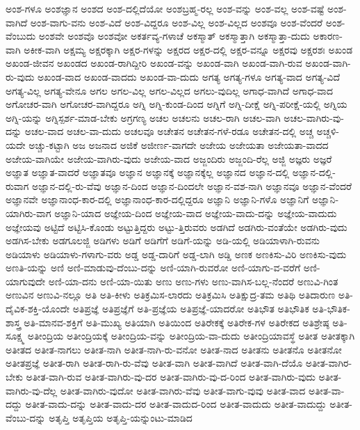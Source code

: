 {ಅಂಶ-ಗಳೂ
ಅಂಶಜ್ಞಾನ
ಅಂಶದ
ಅಂಶ-ದಲ್ಲಿದೆಯೋ
ಅಂಶಬ್ರಹ್ಮ-ರಲ್ಲ
ಅಂಶ-ವನ್ನು
ಅಂಶ-ವಲ್ಲ
ಅಂಶ-ವಷ್ಟೆ
ಅಂಶ-ವಾಗಿದೆ
ಅಂಶ-ವಾಗು-ವನು
ಅಂಶ-ವಿದೆ
ಅಂಶ-ವಿದ್ದರೂ
ಅಂಶ-ವಿಲ್ಲ
ಅಂಶ-ವಿಲ್ಲದ
ಅಂಶವೂ
ಅಂಶ-ವೆಂದರೆ
ಅಂಶ-ವೆಂಬುದು
ಅಂಶವೇ
ಅಂಶವೊ
ಅಂಶವೋ
ಅಕರ್ತವ್ಯ-ಗಳಾಚೆ
ಅಕಸ್ಮಾತ್
ಅಕಸ್ಮಾತ್ತಾಗಿ
ಅಕಸ್ಮಾತ್ತಾ-ದುದು
ಅಕಾರಣ-ವಾಗಿ
ಅಕೀಕ-ವಾಗಿ
ಅಕ್ಷಮ್ಯ
ಅಕ್ಷರಕ್ಕಾಗಿ
ಅಕ್ಷರ-ಗಳನ್ನು
ಅಕ್ಷರದ
ಅಕ್ಷರ-ದಲ್ಲಿ
ಅಕ್ಷರ-ವನ್ನೂ
ಅಕ್ಷರವು
ಅಕ್ಷರಶಃ
ಅಖಂಡ
ಅಖಂಡ-ಜೀವನ
ಅಖಂಡದ
ಅಖಂಡ-ರಾಗಿದ್ದೀರಿ
ಅಖಂಡ-ವನ್ನು
ಅಖಂಡ-ವಾಗಿ
ಅಖಂಡ-ವಾಗಿ-ರುವ
ಅಖಂಡ-ವಾಗಿ-ರು-ವುದು
ಅಖಂಡ-ವಾದ
ಅಖಂಡ-ವಾದದು
ಅಖಂಡ-ವಾ-ದುದು
ಅಗತ್ಯ
ಅಗತ್ಯ-ಗಳೂ
ಅಗತ್ಯ-ವಾದ
ಅಗತ್ಯ-ವಿದೆ
ಅಗತ್ಯ-ವಿಲ್ಲ
ಅಗತ್ಯ-ವೇನೂ
ಅಗಲ
ಅಗಲ-ವಿಲ್ಲ
ಅಗಲ-ವಿಲ್ಲದ
ಅಗಲು-ವುದಿಲ್ಲ
ಅಗಾಧ-ವಾಗಿದೆ
ಅಗಾಧ-ವಾದ
ಅಗೋಚರ-ವಾಗಿ
ಅಗೋಚರ-ವಾಗಿದ್ದರೂ
ಅಗ್ನಿ
ಅಗ್ನಿ-ಕುಂಡ-ದಿಂದ
ಅಗ್ನಿಗೆ
ಅಗ್ನಿ-ದೀಕ್ಷೆ
ಅಗ್ನಿ-ಪರೀಕ್ಷೆ-ಯಲ್ಲಿ
ಅಗ್ನಿಯ
ಅಗ್ನಿ-ಯನ್ನು
ಅಗ್ನಿಸ್ಪರ್ಶ-ಮಾಡ-ಬೇಕು
ಅಗ್ರಗಣ್ಯ
ಅಚಲ
ಅಚಲನು
ಅಚಲ-ರಾಗಿ
ಅಚಲ-ವಾಗಿ
ಅಚಲ-ವಾಗಿರು-ವು-ದನ್ನು
ಅಚಲ-ವಾದ
ಅಚಲ-ವಾ-ದುದು
ಅಚಲವೂ
ಅಚೇತನ
ಅಚೇತನ-ಗಳೆ-ರಡೂ
ಅಚೇತನ-ದಲ್ಲಿ
ಅಚ್ಚ
ಅಚ್ಚಳಿ-ಯದೇ
ಅಚ್ಚು-ಕಟ್ಟಾಗಿ
ಅಜ
ಅಜನಾದ
ಅಜಿಕೆ
ಅಜೀರ್ಣ-ವಾಗದೇ
ಅಜೇಯ
ಅಜೇಯತಾ
ಅಜೇಯತಾ-ವಾದದ
ಅಜೇಯ-ವಾಗಿಯೇ
ಅಜೇಯ-ವಾಗಿರು-ವುದು
ಅಜೇಯ-ವಾದ
ಅಜ್ಜಂದಿರು
ಅಜ್ಜಂದಿ-ರೆಲ್ಲ
ಅಜ್ಜಿ
ಅಜ್ಞರು
ಅಜ್ಞರೆ
ಅಜ್ಞಾತ
ಅಜ್ಞಾತ-ವಾದರೆ
ಅಜ್ಞಾತವೂ
ಅಜ್ಞಾನ
ಅಜ್ಞಾನಕ್ಕೆ
ಅಜ್ಞಾನಕ್ಕೆಲ್ಲ
ಅಜ್ಞಾನದ
ಅಜ್ಞಾನ-ದಲ್ಲಿ
ಅಜ್ಞಾನ-ದಲ್ಲಿ-ರುವಾಗ
ಅಜ್ಞಾನ-ದಲ್ಲಿ-ರು-ವೆವು
ಅಜ್ಞಾನ-ದಿಂದ
ಅಜ್ಞಾನ-ದಿಂದಲೇ
ಅಜ್ಞಾನ-ವಶ-ನಾಗಿ
ಅಜ್ಞಾನವೂ
ಅಜ್ಞಾನ-ವೆಂದರೆ
ಅಜ್ಞಾನವೇ
ಅಜ್ಞಾನಾಂಧ-ಕಾರ-ದಲ್ಲಿ
ಅಜ್ಞಾನಾಂಧ-ಕಾರ-ದಲ್ಲಿದ್ದರೂ
ಅಜ್ಞಾನಿ
ಅಜ್ಞಾನಿ-ಗಳೊ
ಅಜ್ಞಾನಿಗೆ
ಅಜ್ಞಾನಿ-ಯಾಗಿರು-ವಾಗ
ಅಜ್ಞಾನಿ-ಯಾದ
ಅಜ್ಞೇಯ-ದಿಂದ
ಅಜ್ಞೇಯ-ವಾದ
ಅಜ್ಞೇಯ-ವಾದು-ದನ್ನು
ಅಜ್ಞೇಯ-ವಾದುದು
ಅಜ್ಞೇಯವು
ಅಟ್ಟಿದೆ
ಅಟ್ಟಿಸಿ-ಕೊಂಡು
ಅಟ್ಟುತ್ತಿದ್ದರು
ಅಟ್ಟು-ತ್ತಿರುವರು
ಅಡಗಿದೆ
ಅಡಗಿರು-ವಂತೆಯೇ
ಅಡಗಿರು-ವುದು
ಅಡಗಿಸ-ಬೇಕು
ಅಡಗೂಲಜ್ಜಿ
ಅಡಿಗಳು
ಅಡಿಗೆ
ಅಡಿಗೆಗೆ
ಅಡಿಗೆ-ಯನ್ನು
ಅಡಿ-ಯಲ್ಲಿ
ಅಡಿಯಾಳಾಗಿ-ರುವನು
ಅಡಿಯಾಳು
ಅಡಿಯಾಳು-ಗಳಾಗು-ವರು
ಅಡ್ಡ
ಅಡ್ಡ-ದಾರಿಗೆ
ಅಡ್ಡ-ಲಾಗಿ
ಅಡ್ಡಿ
ಅಣಕ
ಅಣಕಿಸು-ವಿರಿ
ಅಣಕಿಸು-ವುದು
ಅಣತಿ-ಯನ್ನು
ಅಣಿ
ಅಣಿ-ಮಾಡುವು-ದೆಂಬು-ದನ್ನು
ಅಣಿ-ಯಾಗಿ-ರುವರೋ
ಅಣಿ-ಯಾಗು-ವ-ವರೆಗೆ
ಅಣಿ-ಯಾಗುವುದೇ
ಅಣಿ-ಯಾ-ದನು
ಅಣಿ-ಯಾ-ಯಿತು
ಅಣು
ಅಣು-ಗಳು
ಅಣು-ವಾಗಿಸ-ಬಲ್ಲ-ನೆಂದರೆ
ಅಣುವಿ-ಗಿಂತ
ಅಣುವಿನ
ಅಣುವಿ-ನಲ್ಲೂ
ಅತಿ
ಅತಿ-ಕೀಳು
ಅತಿಕ್ರಮಿಸ-ಲಾರದು
ಅತಿಕ್ರಮಿಸಿ
ಅತಿಕ್ಷುದ್ರ-ತಮ
ಅತಿಥಿ
ಅತಿದಾರುಣ
ಅತಿ-ದೈವಿಕ-ಶಕ್ತಿ-ಯೊಂದೇ
ಅತಿಪ್ರಜ್ಞೆ
ಅತಿಪ್ರಜ್ಞೆಗೆ
ಅತಿ-ಪ್ರಜ್ಞೆಯ
ಅತಿಪ್ರಜ್ಞೆ-ಯಾದರೋ
ಅತಿಭೌತ
ಅತಿಭೌತಿಕ
ಅತಿ-ಭೌತಿಕ-ಶಾಸ್ತ್ರ
ಅತಿ-ಮಾನವ-ಶಕ್ತಿಗೆ
ಅತಿ-ಮುಖ್ಯ
ಅತಿಯಾಗಿ
ಅತಿಯಿಂದ
ಅತಿರೇಕಕ್ಕೆ
ಅತಿರೇಕ-ಗಳ
ಅತಿರೇಕದ
ಅತಿಶ್ರೇಷ್ಠ
ಅತಿ-ಸೂಕ್ಷ್ಮ
ಅತೀಂದ್ರಿಯ
ಅತೀಂದ್ರಿಯಕ್ಕೆ
ಅತೀಂದ್ರಿಯ-ವನ್ನು
ಅತೀಂದ್ರಿಯ-ವಾ-ದುದು
ಅತೀಂದ್ರಿಯಾವಸ್ಥೆ
ಅತೀತ
ಅತೀತಕ್ಕಾಗಿ
ಅತೀತದ
ಅತೀತ-ನಾಗಲು
ಅತೀತ-ನಾಗಿ
ಅತೀತ-ನಾಗಿ-ರು-ವನೋ
ಅತೀತ-ನಾದ
ಅತೀತನು
ಅತೀತನೊ
ಅತೀತನೋ
ಅತೀತಪ್ರಜ್ಞೆ
ಅತೀತ-ರಾಗಿ
ಅತೀತ-ರಾಗಿ-ರು-ವೆವು
ಅತೀತ-ವಾಗಿ
ಅತೀತ-ವಾಗಿದೆ
ಅತೀತ-ವಾಗಿ-ದೆಯೊ
ಅತೀತ-ವಾಗಿರ-ಬೇಕು
ಅತೀತ-ವಾಗಿ-ರುವ
ಅತೀತ-ವಾಗಿರು-ವು-ದರ
ಅತೀತ-ವಾಗಿರು-ವು-ದ-ರಿಂದ
ಅತೀತ-ವಾಗಿರು-ವುದು
ಅತೀತ-ವಾಗಿರು-ವು-ದೆಲ್ಲ
ಅತೀತ-ವಾಗಿರು-ವುದೋ
ಅತೀತ-ವಾಗಿರು-ವೆವು
ಅತೀತ-ವಾಗು-ವುವು
ಅತೀತ-ವಾದ
ಅತೀತ-ವಾ-ದದ್ದು
ಅತೀತ-ವಾದು-ದನ್ನು
ಅತೀತ-ವಾದು-ದರ
ಅತೀತ-ವಾದುದ-ರಿಂದ
ಅತೀತ-ವಾದುದು
ಅತೀತ-ವಾದುದ್ದು
ಅತೀತ-ವೆಂಬು-ದನ್ನು
ಅತೃಪ್ತಿ
ಅತೃಪ್ತಿಯ
ಅತೃಪ್ತಿ-ಯನ್ನುಂಟು-ಮಾಡಿದ
}
